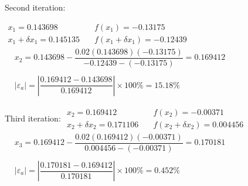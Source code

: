 \documentclass[../main.tex]{subfiles}
\begin{document}
\begin{enumerate}[label=\bfseries(\alph*)]
Second iteration:
\bigbreak

$\begin{array}{ll}x_{1}=0.143698 &\quad f\left(x_{1}\right)=-0.13175 \\x_{1}+\delta x_{1}=0.145135 &\quad f\left(x_{1}+\delta x_{1}\right)=-0.12439\end{array}$
\bigbreak$
\begin{aligned}
&x_{2}=0.143698-\dfrac{0.02(0.143698)(-0.13175)}{-0.12439-(-0.13175)}=0.169412 \\\\
&\left|\varepsilon_{a}\right|=\left|\dfrac{0.169412-0.143698}{0.169412}\right| \times 100 \%=15.18 \%
\end{aligned}$
\bigbreak

Third iteration:
\bigbreak
$\begin{array}{ll}x_{2}=0.169412 &\quad f\left(x_{2}\right)=-0.00371 \\x_{2}+\delta x_{2}=0.171106 &\quad f\left(x_{2}+\delta x_{2}\right)=0.004456\end{array}$
\bigbreak$
\begin{aligned}
&x_{3}=0.169412-\dfrac{0.02(0.169412)(-0.00371)}{0.004456-(-0.00371)}=0.170181 \\\\
&\left|\varepsilon_{a}\right|=\left|\dfrac{0.170181-0.169412}{0.170181}\right| \times 100 \%=0.452 \%
\end{aligned}$
\bigbreak
\end{enumerate}
\end{document}
